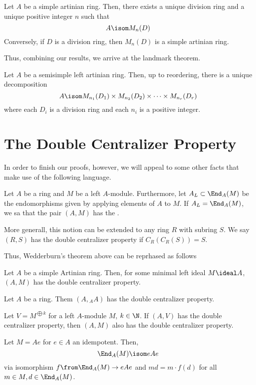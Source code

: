 \documentclass[11pt,leqno,oneside]{amsbook}
\numberwithin{thm}{section}
\begin{document}
\begin{thm}[Wedderburn]
  Let \(A\) be a simple artinian ring. Then, there exists a unique
  division ring and a unique positive integer \(n\) such that \[
    A \isom M_n(D)
  \]
  Conversely, if \(D\) is a division ring, then \(M_n(D)\) is a simple
  artinian ring. 
\end{thm}
Thus, combining our results, we arrive at the landmark theorem.
\begin{thm}
  Let \(A\) be a semisimple left artinian ring. Then, up to reordering,
  there is a unique decomposition \[
    A \isom M_{n_1}(D_1) \times M_{n_2}(D_2) \times \cdots \times M_{n_r}(D_r)
  \]
  where each \(D_i\) is a division ring and each \(n_i\) is a positive
  integer.
\end{thm}
\section{The Double Centralizer Property}
In order to finish our proofs, however, we will appeal to some other
facts that make use of the following language.
\begin{defn}
  Let \(A\) be a ring and \(M\) be a left \(A\)-module. Furthermore,
  let \(A_L \subset \End_A(M)\) be the endomorphisms given by applying
  elements of \(A\) to \(M\). If \(A_L = \End_A(M)\), we sa that the
  pair \((A,M)\) has the . 
\end{defn}
\begin{rmk}
  More generall, this notion can be extended to any ring \(R\) with
  subring \(S\). We say \((R,S)\) has the double centralizer property
  if \(C_R(C_R(S)) = S\).
\end{rmk}
Thus, Wedderburn's theorem above can be reprhased as follows
\begin{thm}[Wedderburn]
  Let \(A\) be a simple Artinian ring. Then, for some
  minimal left ideal \(M \ideal A\), \((A,M)\) has the double
  centralizer property.
\end{thm}
\begin{lem}
  Let \(A\) be a ring. Them \((A,{}_A A)\) has the double centralizer
  property. 
\end{lem}
\begin{lem}
  Let \(V = M^{\bigoplus k}\) for a left \(A\)-module \(M\), \(k \in
  \N\). If \((A,V)\) has the double centralizer property, then
  \((A,M)\) also has the double centralizer property.
\end{lem}
\begin{lem}
  Let \(M = Ae\) for \(e \in A\) an idempotent. Then, \[
    \End_A(M) \isom eAe
  \]
  via isomorphism \(f \from \End_A(M) \to eAe\) and \(md = m \cdot f(d)\) for all \(m \in M, d
  \in \End_A(M)\). 
\end{lem}
\end{document}
